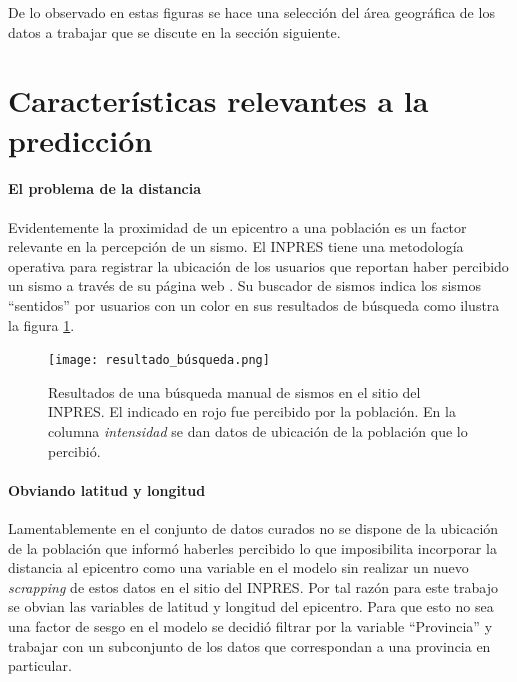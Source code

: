 \documentclass[a4paper]{report}
\begin{document}
De lo observado en estas figuras se hace una selección del área geográfica de los datos a trabajar que se discute en la sección siguiente.





\section{Características relevantes a la predicción}

\paragraph{El problema de la distancia}
Evidentemente la proximidad de un epicentro a una población es un factor relevante en la percepción de un sismo.
El INPRES tiene una metodología operativa para registrar la ubicación de los usuarios que reportan haber percibido un sismo a través de su página web \cite{noauthor_acerca_nodate}.
Su buscador de sismos indica los sismos ``sentidos'' por usuarios con un color en sus resultados de búsqueda como ilustra la figura \ref{fig:resultado_búsqueda}.

\begin{figure}[!h]
\centering
\texttt{[image: resultado\_búsqueda.png]}
\caption{Resultados de una búsqueda manual de sismos en el sitio del INPRES. El indicado en rojo fue percibido por la población. En la columna \emph{intensidad} se dan datos de ubicación de la población que lo percibió.}
\label{fig:resultado_búsqueda}
\end{figure}


\paragraph{Obviando latitud y longitud}
Lamentablemente en el conjunto de datos curados no se dispone de la ubicación de la población que informó haberles percibido lo que imposibilita incorporar la distancia al epicentro como una variable en el modelo sin realizar un nuevo \emph{scrapping} de estos datos en el sitio del INPRES.
Por tal razón para este trabajo se obvian las variables de latitud y longitud del epicentro.
Para que esto no sea una factor de sesgo en el modelo se decidió filtrar por la variable ``Provincia'' y trabajar con un subconjunto de los datos que correspondan a una provincia en particular.
\end{document}
